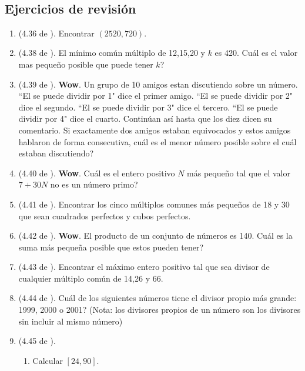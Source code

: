 \begin{exers}{\ \\}
	\begin{center}
		\vspace{-5mm}
		\section*{Ejercicios de revisión}\label{section_ejercicios_factorizacion_prima_MCM_MCD}
	\end{center}
	\begin{enumerate}
		\item (4.36 de \cite{Aops_TN}). Encontrar $(2520,720)$.
		\item (4.38 de \cite{Aops_TN}). El mínimo común múltiplo de 12,15,20 y $k$ es 420. Cuál es el valor mas pequeño posible que puede tener $k$?
		\item (4.39 de \cite{Aops_TN}). \textbf{Wow}. Un grupo de 10 amigos estan discutiendo sobre un número. ``El se puede dividir por 1" dice el primer amigo. ``El se puede dividir por 2" dice el segundo. ``El se puede dividir por 3" dice el tercero. ``El se puede dividir por 4" dice el cuarto. Continúan así hasta que los diez dicen su comentario.  Si exactamente dos amigos estaban equivocados y estos amigos hablaron de forma consecutiva, cuál es el menor número posible sobre el cuál estaban discutiendo?
		\item (4.40 de \cite{Aops_TN}). \textbf{Wow}. Cuál es el entero positivo $N$ más pequeño tal que el valor $7+30N$ no es un número primo?
		\item (4.41 de \cite{Aops_TN}). Encontrar los cinco múltiplos comunes más pequeños de 18 y 30 que sean cuadrados perfectos y cubos perfectos.				
		\item (4.42 de \cite{Aops_TN}). \textbf{Wow}. El producto de un conjunto de números es 140. Cuál es la suma más pequeña posible que estos pueden tener?		
		\item (4.43 de \cite{Aops_TN}). Encontrar el máximo entero positivo tal que sea divisor de cualquier múltiplo común de 14,26 y 66.
		\item (4.44 de \cite{Aops_TN}). Cuál de los siguientes números tiene el divisor propio más grande: 1999, 2000 o 2001? (Nota: los divisores propios de un número son los divisores sin incluir al mismo número)
		\item (4.45 de \cite{Aops_TN}). 	
						\begin{enumerate}[label=\Alph*)]
							\item Calcular $[24,90]$.

\end{enumerate}
\end{enumerate}
\end{exers}
